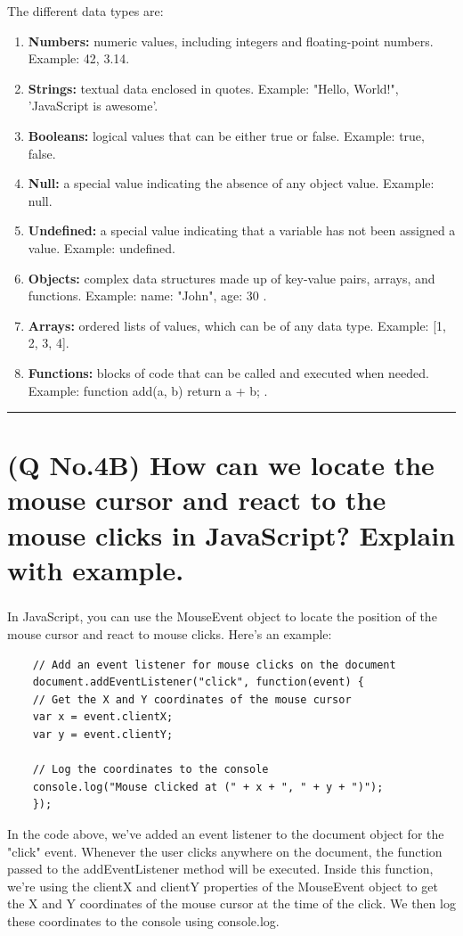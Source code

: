 \documentclass[11pt]{article}
\begin{document}
The different data types are:
\begin{enumerate}
    \item \textbf{Numbers:} numeric values, including integers and floating-point numbers. Example: 42, 3.14.

    \item \textbf{Strings:} textual data enclosed in quotes. Example: "Hello, World!", 'JavaScript is awesome'.
    
    \item \textbf{Booleans:} logical values that can be either true or false. Example: true, false.
    
    \item \textbf{Null:} a special value indicating the absence of any object value. Example: null.
    
    \item \textbf{Undefined:} a special value indicating that a variable has not been assigned a value. Example: undefined.
    
    \item \textbf{Objects:} complex data structures made up of key-value pairs, arrays, and functions. Example: { name: "John", age: 30 }.
    
    \item \textbf{Arrays:} ordered lists of values, which can be of any data type. Example: [1, 2, 3, 4].
    
    \item \textbf{Functions:} blocks of code that can be called and executed when needed. Example: function add(a, b) { return a + b; }.
\end{enumerate}


\noindent\rule{\linewidth}{0.4pt}
\section{(Q No.4B) How can we locate the mouse cursor and react to the mouse clicks in JavaScript? Explain with example. } 
\subparagraph{}
In JavaScript, you can use the MouseEvent object to locate the position of the mouse cursor and react to mouse clicks. Here's an example:
\begin{lstlisting}
    // Add an event listener for mouse clicks on the document
    document.addEventListener("click", function(event) {
    // Get the X and Y coordinates of the mouse cursor
    var x = event.clientX;
    var y = event.clientY;
    
    // Log the coordinates to the console
    console.log("Mouse clicked at (" + x + ", " + y + ")");
    });
\end{lstlisting}
In the code above, we've added an event listener to the document object for the "click" event. Whenever the user clicks anywhere on the document, the function passed to the addEventListener method will be executed. Inside this function, we're using the clientX and clientY properties of the MouseEvent object to get the X and Y coordinates of the mouse cursor at the time of the click. We then log these coordinates to the console using console.log.
\end{document}
